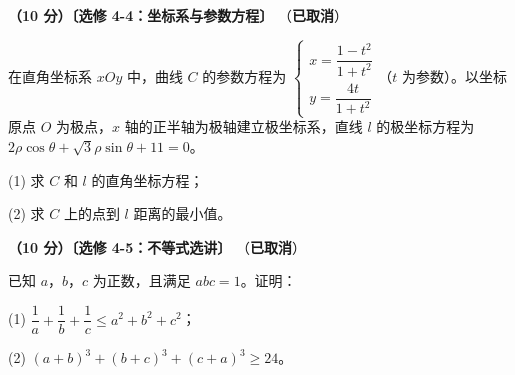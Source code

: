 \textbf{（10 分）〔选修 4-4：坐标系与参数方程〕} （\textbf{已取消}）

在直角坐标系 $xOy$ 中，曲线 $C$ 的参数方程为 $\begin{cases}x=\dfrac{1-t^{2}}{1+t^{2}}\\[2mm] y=\dfrac{4t}{1+t^{2}}\end{cases}$（$t$ 为参数）。以坐标原点 $O$ 为极点，$x$ 轴的正半轴为极轴建立极坐标系，直线 $l$ 的极坐标方程为 $2\rho\cos\theta+\sqrt3\rho\sin\theta+11=0$。

  (1) 求 $C$ 和 $l$ 的直角坐标方程；

  (2) 求 $C$ 上的点到 $l$ 距离的最小值。

\textbf{（10 分）〔选修 4-5：不等式选讲〕} （\textbf{已取消}）

已知 $a$，$b$，$c$ 为正数，且满足 $abc=1$。证明：

  (1) $\dfrac1a+\dfrac1b+\dfrac1c\le a^{2}+b^{2}+c^{2}$；

  (2) $(a+b)^{3}+(b+c)^{3}+(c+a)^{3}\ge24$。

\par\medskip

